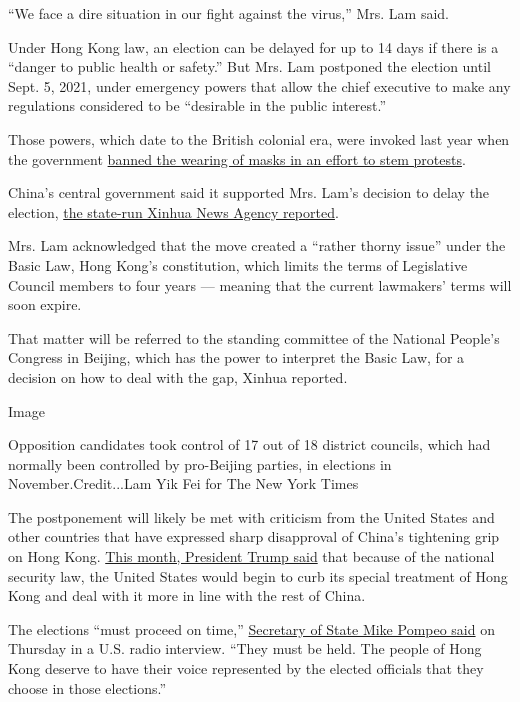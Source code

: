 ``We face a dire situation in our fight against the virus,'' Mrs. Lam
said.

Under Hong Kong law, an election can be delayed for up to 14 days if
there is a ``danger to public health or safety.'' But Mrs. Lam postponed
the election until Sept. 5, 2021, under emergency powers that allow the
chief executive to make any regulations considered to be ``desirable in
the public interest.''

Those powers, which date to the British colonial era, were invoked last
year when the government
\href{https://www.nytimes3xbfgragh.onion/2019/10/04/world/asia/hong-kong-emergency-powers.html}{banned
the wearing of masks in an effort to stem protests}.

China's central government said it supported Mrs. Lam's decision to
delay the election,
\href{https://xhpfmapi.zhongguowangshi.com/vh512/share/9292212}{the
state-run Xinhua News Agency reported}.

Mrs. Lam acknowledged that the move created a ``rather thorny issue''
under the Basic Law, Hong Kong's constitution, which limits the terms of
Legislative Council members to four years --- meaning that the current
lawmakers' terms will soon expire.

That matter will be referred to the standing committee of the National
People's Congress in Beijing, which has the power to interpret the Basic
Law, for a decision on how to deal with the gap, Xinhua reported.

Image

Opposition candidates took control of 17 out of 18 district councils,
which had normally been controlled by pro-Beijing parties, in elections
in November.Credit...Lam Yik Fei for The New York Times

The postponement will likely be met with criticism from the United
States and other countries that have expressed sharp disapproval of
China's tightening grip on Hong Kong.
\href{https://www.nytimes3xbfgragh.onion/2020/05/29/us/politics/trump-hong-kong-china-WHO.html}{This
month, President Trump said} that because of the national security law,
the United States would begin to curb its special treatment of Hong Kong
and deal with it more in line with the rest of China.

The elections ``must proceed on time,''
\href{https://www.state.gov/secretary-michael-r-pompeo-with-simon-conway-of-the-joe-pags-show/}{Secretary
of State Mike Pompeo said} on Thursday in a U.S. radio interview. ``They
must be held. The people of Hong Kong deserve to have their voice
represented by the elected officials that they choose in those
elections.''

